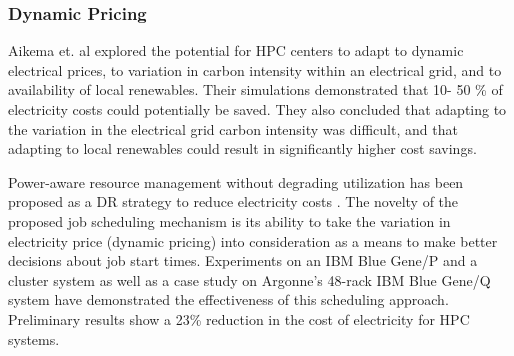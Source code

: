 \subsubsection{Dynamic Pricing}
Aikema et. al \cite{aikema_electrical_2011} explored the potential for HPC
centers to adapt to dynamic electrical prices, to variation in carbon intensity
within an electrical grid, and to availability of local renewables. Their
simulations demonstrated that 10- 50 \% of electricity costs could potentially
be saved. They also concluded that adapting to the variation in the electrical
grid carbon intensity was difficult, and that adapting to local renewables could
result in significantly higher cost savings.

Power-aware resource management without degrading utilization has been proposed
as a DR strategy to reduce electricity costs
\cite{yang_integrating_2013,zhou_reducing_2013}. The novelty of the proposed job
scheduling mechanism is its ability to take the variation in electricity price
(dynamic pricing) into consideration as a means to make better decisions about
job start times. Experiments on an IBM Blue Gene/P and a cluster system as well
as a case study on Argonne's 48-rack IBM Blue Gene/Q system have demonstrated
the effectiveness of this scheduling approach. Preliminary results show a 23\%
reduction in the cost of electricity for HPC systems.

